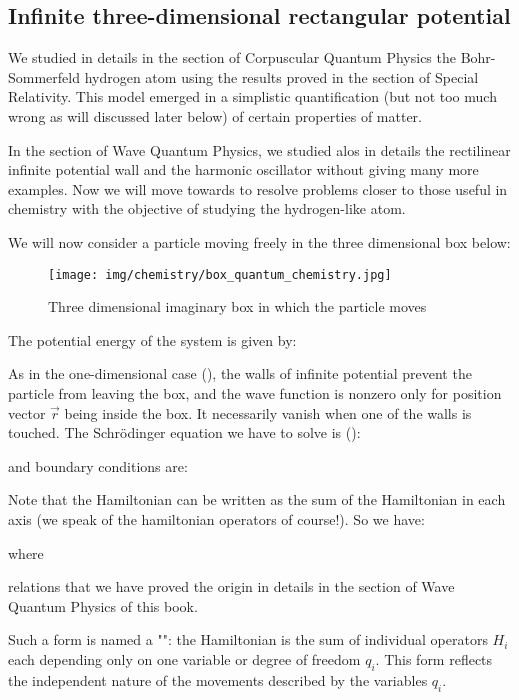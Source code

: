	\subsection{Infinite three-dimensional rectangular potential}
	We studied in details in the section of Corpuscular Quantum Physics the Bohr-Sommerfeld hydrogen atom using the results proved in the section of Special Relativity. This model emerged in a simplistic quantification (but not too much wrong as will discussed later below) of certain properties of matter.
	
	In the section of Wave Quantum Physics, we studied alos in details the rectilinear infinite potential wall and the harmonic oscillator without giving many more examples. Now we will move towards to resolve problems closer to those useful in chemistry with the objective of studying the hydrogen-like atom.
	
	We will now consider a particle moving freely in the three dimensional box below:
	\begin{figure}[H]
		\begin{center}
		\texttt{[image: img/chemistry/box\_quantum\_chemistry.jpg]}
		\end{center}	
		\caption[]{Three dimensional imaginary box in which the particle moves}
	\end{figure}

	The potential energy of the system is given by:	

	
	As in the one-dimensional case (), the walls of infinite potential prevent the particle from leaving the box, and the wave function is nonzero only for position vector $\vec{r}$ being inside the box. It  necessarily vanish when one of the walls is touched. The Schrödinger equation we have to solve is ():
	
	and boundary conditions are:
	
	Note that the Hamiltonian can be written as the sum of the Hamiltonian in each axis (we speak of the hamiltonian operators of course!). So we have:
	
	where
	
	relations that we have proved the origin in details in the section of Wave Quantum Physics of this book.
	
	Such a form is named a "": the Hamiltonian is the sum of individual operators $H_i$ each depending only on one variable or degree of freedom $q_i$. This form reflects the independent nature of the movements described by the variables $q_i$.
	
